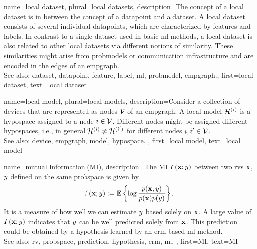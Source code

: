 	
{name={local dataset}, plural={local datasets}, 
	description={The concept of a local \gls{dataset} is 
		in between the concept of a \gls{datapoint} and a \gls{dataset}. A local \gls{dataset} consists of several 
		individual \glspl{datapoint}, which are characterized by \glspl{feature} and \glspl{label}. 
		In contrast to a single \gls{dataset} used in basic \gls{ml} methods, a local \gls{dataset} is also 
		related to other local \glspl{dataset} via different notions of similarity. These similarities 
		might arise from \glspl{probmodel} or communication infrastructure and 
		are encoded in the edges of an \gls{empgraph}.
				\\
		See also: \gls{dataset}, \gls{datapoint}, \gls{feature}, \gls{label}, \gls{ml}, \gls{probmodel}, \gls{empgraph}.},
		first={local dataset},
		text={local dataset}
}
	
{name={local model}, plural={local models}, 
	description={Consider a collection of \glspl{device} that are represented 
		as nodes $\mathcal{V}$ of an \gls{empgraph}. A local \gls{model} $\mathcal{H}^{(i)}$ 
		is a \gls{hypospace} assigned to a node $i \in \mathcal{V}$. Different nodes might be 
		assigned different \glspl{hypospace}, i.e., in general $\mathcal{H}^{(i)} \neq \mathcal{H}^{(i')}$ for different 
		nodes $i, i' \in \mathcal{V}$. 
				\\
		See also: \gls{device}, \gls{empgraph}, \gls{model}, \gls{hypospace}. },
	first={local model},
	text={local model}
}
	
{name={mutual information (MI)},
 	description={The MI $I \left( {\bf x};y\right)$ 
 		between two \glspl{rv} ${\bf x}$, $y$ defined on the same \gls{probspace} 
 		is given by \cite{coverthomas} $$I \left( {\bf x};y\right) := 
		\mathbb{E} \left\{ \log \frac{p ({\bf x},y)}{p({\bf x})p(y)} \right\}.$$ 
		It is a measure of how well we can estimate $y$ based 
		solely on ${\bf x}$. A large value of $I \left( {\bf x};y\right)$ indicates that 
		$y$ can be well predicted solely from ${\bf x}$. This \gls{prediction} could be obtained by a 
		\gls{hypothesis} learned by an \gls{erm}-based \gls{ml} method. 
				\\
		See also: \gls{rv}, \gls{probspace}, \gls{prediction}, \gls{hypothesis}, \gls{erm}, \gls{ml}. }, 
	first={MI}, 
	text={MI} 
}

